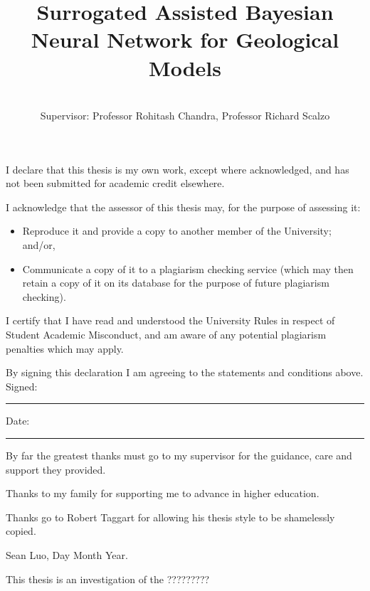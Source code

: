 \documentclass[honours,12pt]{unswthesis}
\title{Surrogated Assisted Bayesian Neural Network for Geological Models}
\author{\Authornameonly\\{\bigskip}Supervisor: Professor Rohitash Chandra, Professor Richard Scalzo}
\newcommand\blankpage{%
    \null
    \thispagestyle{empty}%
    \addtocounter{page}{-1}%
    \newpage}
\numberwithin{equation}{section}
\begin{document}
\beforepreface

\afterpage{\blankpage}



\vskip 10pc \noindent I declare that this thesis is my
own work, except where acknowledged, and has not been submitted for
academic credit elsewhere. 

\vskip 2pc  \noindent I acknowledge that the assessor of this
thesis may, for the purpose of assessing it:
\begin{itemize}
\item Reproduce it and provide a copy to another member of the University; and/or,
\item Communicate a copy of it to a plagiarism checking service (which may then retain a copy of it on its database for the purpose of future plagiarism checking).
\end{itemize}

\vskip 2pc \noindent I certify that I have read and understood the University Rules in
respect of Student Academic Misconduct, and am aware of any potential plagiarism penalties which may 
apply.\vspace{24pt}

\vskip 2pc \noindent By signing 
this declaration I am
agreeing to the statements and conditions above.
\vskip 2pc \noindent
Signed: \rule{7cm}{0.25pt} \hfill Date: \rule{4cm}{0.25pt} \newline
\vskip 1pc

\afterpage{\blankpage}




{\bigskip}By far the greatest thanks must go to my supervisor for
the guidance, care and support they provided. 
 
{\bigskip} Thanks to my family for supporting me to advance in higher education.

{\bigskip\noindent} Thanks go to Robert Taggart for allowing his thesis
style to be shamelessly copied.

{\bigskip\bigskip\bigskip\noindent} Sean Luo, Day Month Year.

\afterpage{\blankpage}



This thesis is an investigation of the ?????????
\end{document}
